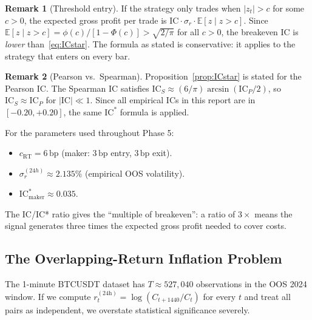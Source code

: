 \documentclass[12pt, a4paper]{article}
\theoremstyle{plain}
\theoremstyle{definition}
\newtheorem{remark}{Remark}[section]
\newcommand{\IC}{\mathrm{IC}}
\newcommand{\E}{\mathbb{E}}
\newcommand{\bp}{\,\mathrm{bp}}
\begin{document}
\begin{remark}[Threshold entry]
  If the strategy only trades when $|z_t| > c$ for some $c > 0$, the expected
  gross profit per trade is $\IC \cdot \sigma_r \cdot \E[z \mid z > c]$.  Since
  $\E[z \mid z > c] = \phi(c)/[1-\Phi(c)] > \sqrt{2/\pi}$ for all $c > 0$,
  the breakeven IC is \emph{lower} than~\eqref{eq:ICstar}.  The formula as
  stated is conservative: it applies to the strategy that enters on every bar.
\end{remark}

\begin{remark}[Pearson vs.\ Spearman]
  Proposition~\ref{prop:ICstar} is stated for the Pearson IC.  The Spearman
  IC satisfies $\IC_S \approx (6/\pi)\arcsin(\IC_P / 2)$, so
  $\IC_S \approx \IC_P$ for $|\IC| \ll 1$.  Since all empirical ICs in this
  report are in $[-0.20, +0.20]$, the same $\IC^*$ formula is applied.
\end{remark}

For the parameters used throughout Phase 5:
\begin{itemize}[noitemsep]
  \item $c_{\mathrm{RT}} = 6\bp$ (maker: $3\bp$ entry, $3\bp$ exit).
  \item $\sigma_r^{(24h)} \approx 2.135\%$ (empirical OOS volatility).
  \item $\IC^*_{\mathrm{maker}} \approx 0.035$.
\end{itemize}

The IC/IC* ratio gives the ``multiple of breakeven'': a ratio of $3\times$
means the signal generates three times the expected gross profit needed
to cover costs.

\subsection{The Overlapping-Return Inflation Problem}
\label{sec:overlap}

The 1-minute BTCUSDT dataset has $T \approx 527{,}040$ observations in the OOS
2024 window.  If we compute $r_t^{(24\text{h})} = \log(C_{t+1440}/C_t)$
for every $t$ and treat all pairs as independent, we overstate statistical
significance severely.
\end{document}
